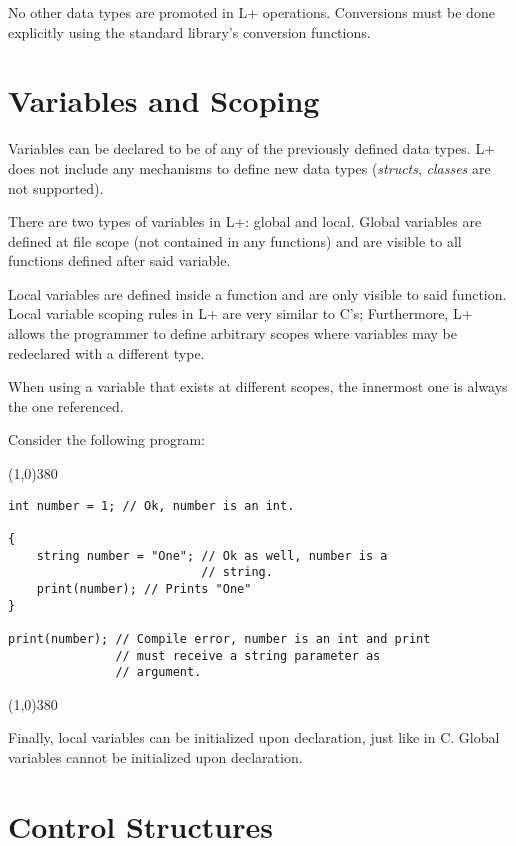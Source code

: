 \documentclass[11pt, a4paper]{article}
\begin{document}
No other data types are promoted in L+ operations. Conversions must be done explicitly using the standard library's conversion functions.

\section{Variables and Scoping}

Variables can be declared to be of any of the previously defined data types. L+ does not include any mechanisms to define new data types (\emph{structs}, \emph{classes} are not supported).

There are two types of variables in L+: global and local. Global variables are defined at file scope (not contained in any functions) and are visible to all functions defined after said variable.

Local variables are defined inside a function and are only visible to said function. Local variable scoping rules in L+ are very similar to C's; Furthermore, L+ allows the programmer to define arbitrary scopes where variables may be redeclared with a different type.

When using a variable that exists at different scopes, the innermost one is always the one referenced.

Consider the following program:
\begin{center}
\line(1,0){380}
\end{center}
\begin{verbatim}
int number = 1; // Ok, number is an int.

{
    string number = "One"; // Ok as well, number is a 
                           // string.
    print(number); // Prints "One"
}

print(number); // Compile error, number is an int and print 
               // must receive a string parameter as 
               // argument.
\end{verbatim}

\begin{center}
\line(1,0){380}
\end{center}


Finally, local variables can be initialized upon declaration, just like in C. Global variables cannot be initialized upon declaration.

\section{Control Structures}
\end{document}
